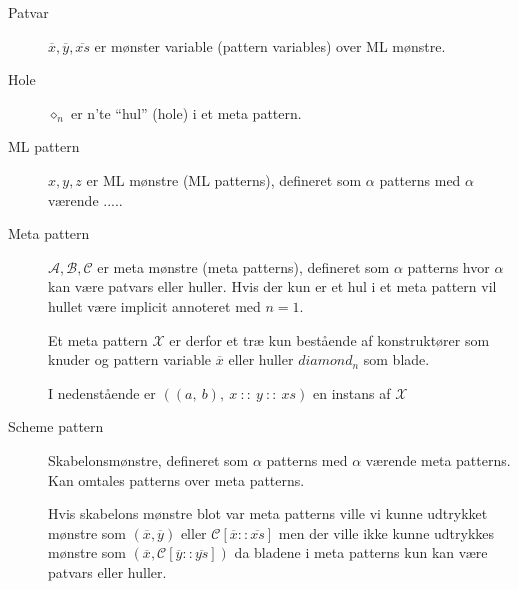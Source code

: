 \documentclass[oneside]{memoir}
\theoremstyle{definition}
\begin{document}
\begin{description}
\item[Patvar] $\overline{x}, \overline{y}, \overline{xs}$ er mønster variable
  (pattern variables) over ML mønstre.


\item[Hole] $\diamond_n$ er n'te "`hul"' (hole) i et meta pattern.


\item[ML pattern] $x,y,z$ er ML mønstre (ML patterns), defineret som $\alpha$ patterns med
  $\alpha$ værende .....  


\item[Meta pattern] $\mathcal{A}, \mathcal{B}, \mathcal{C}$ er meta mønstre
  (meta patterns), defineret som $\alpha$ patterns hvor $\alpha$ kan være
  patvars eller huller. Hvis der kun er et hul i et meta pattern vil hullet være
  implicit annoteret med $n=1$.

  Et meta pattern $\mathcal{X}$ er derfor et træ kun bestående af konstruktører
  som knuder og pattern variable $\overline{x}$ eller huller $diamond_n$ som
  blade.

  I nedenstående er $((a,\ b),\ x\ ::\ y\ ::\ xs)$ en instans af $\mathcal{X}$


  

\item[Scheme pattern] Skabelonsmønstre, defineret som $\alpha$ patterns med
  $\alpha$ værende meta patterns. Kan omtales patterns over meta patterns.

  Hvis skabelons mønstre blot var meta patterns ville vi kunne udtrykket mønstre
  som $(\overline{x}, \overline{y})$ eller $\mathcal{C}[\overline{x} ::
  \overline{xs}]$ men der ville ikke kunne udtrykkes mønstre som $(\overline{x},
  \mathcal{C}[\overline{y} :: \overline{ys}])$ da bladene i meta patterns kun
  kan være patvars eller huller.


\end{description}
\end{document}
